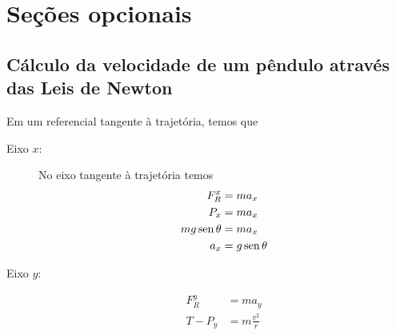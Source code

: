 \section{Seções opcionais}






\subsection{Cálculo da velocidade de um pêndulo através das Leis de Newton}
\label{Sec:SolPenduloLeisDeNewton}

Em um referencial tangente à trajetória, temos que
\begin{description}
    \item[Eixo $x$:] No eixo tangente à trajetória temos
        \begin{align}
            F_R^x &= m a_x \\
            P_x &= m a_x \\
            mg \operatorname{sen}\theta &= m a_x \\
            a_x &= g \operatorname{sen}\theta
        \end{align}
    \item[Eixo $y$:]
        \begin{align}
            F_R^y &= m a_y \\
            T - P_y &= m \frac{v^2}{r}
        \end{align}
\end{description}

